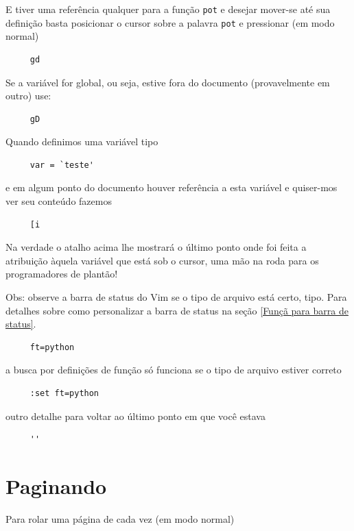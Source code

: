 \documentclass[10pt,a4paper,openany]{book}
\begin{document}
E tiver uma referência qualquer para a função \verb+pot+ e desejar
mover-se até sua definição basta posicionar o cursor sobre a palavra
\verb+pot+ e pressionar (em modo normal)

\begin{verbatim}
     gd
\end{verbatim}

Se a variável for global, ou seja, estive fora do documento
(provavelmente em outro) use:

\begin{verbatim}
     gD
\end{verbatim}

Quando definimos uma variável tipo

\begin{verbatim}
     var = `teste'
\end{verbatim}

e em algum ponto do documento houver referência a esta variável e
quiser-mos ver seu conteúdo fazemos

\begin{verbatim}
     [i
\end{verbatim}
Na verdade o atalho acima lhe mostrará o último ponto onde foi feita
a atribuição àquela variável que está sob o cursor, uma mão na roda
para os programadores de plantão!

Obs: observe a  barra de status do Vim se o tipo de arquivo está certo,
tipo. Para detalhes sobre como personalizar a barra de status na seção
\ref{Funçã para barra de status}.

\begin{verbatim}
     ft=python
\end{verbatim}

a busca por definições de função só funciona se o tipo de arquivo
estiver correto

\begin{verbatim}
     :set ft=python
\end{verbatim}

outro detalhe para voltar ao último ponto em que você estava

\begin{verbatim}
     ''
\end{verbatim}

\section{Paginando}
\label{Paginando}

Para rolar uma página de cada vez (em modo normal)
\end{document}
